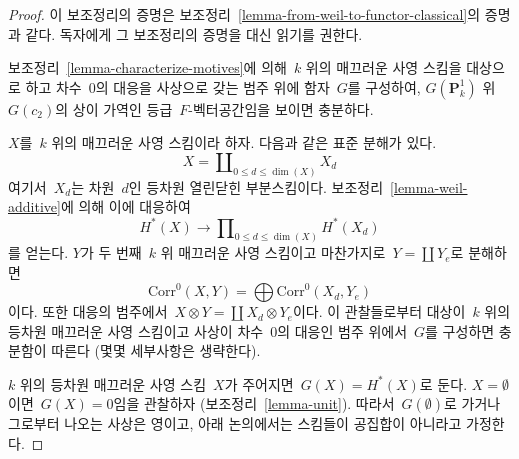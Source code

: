 \begin{proof}
이 보조정리의 증명은 보조정리\ 
\ref{lemma-from-weil-to-functor-classical}의 증명과 같다. 독자에게 그
보조정리의 증명을 대신 읽기를 권한다.

\medskip\noindent
보조정리\  \ref{lemma-characterize-motives}에 의해\  $k$ 위의 매끄러운
사영 스킴을 대상으로 하고 차수\  $0$의 대응을 사상으로 갖는 범주 위에
함자\  $G$를 구성하여, $G(\mathbf{P}^1_k)$ 위\  $G(c_2)$의 상이 가역인
등급\  $F$-벡터공간임을 보이면 충분하다.

\medskip\noindent
$X$를\  $k$ 위의 매끄러운 사영 스킴이라 하자. 다음과 같은 표준 분해가
있다.
$$
X = \coprod\nolimits_{0 \leq d \le \dim(X)} X_d
$$
여기서\  $X_d$는 차원\  $d$인 등차원 열린닫힌 부분스킴이다. 보조정리\ 
\ref{lemma-weil-additive}에 의해 이에 대응하여
$$
H^*(X) \longrightarrow \prod\nolimits_{0 \leq d \le \dim(X)} H^*(X_d)
$$
를 얻는다. $Y$가 두 번째\  $k$ 위 매끄러운 사영 스킴이고 마찬가지로\ 
$Y = \coprod Y_e$로 분해하면
$$
\text{Corr}^0(X, Y) = \bigoplus \text{Corr}^0(X_d, Y_e)
$$
이다. 또한 대응의 범주에서\  $X \otimes Y = \coprod X_d \otimes Y_e$이다.
이 관찰들로부터 대상이\  $k$ 위의 등차원 매끄러운 사영 스킴이고 사상이
차수\  $0$의 대응인 범주 위에서\  $G$를 구성하면 충분함이 따른다
(몇몇 세부사항은 생략한다).

\medskip\noindent
$k$ 위의 등차원 매끄러운 사영 스킴\  $X$가 주어지면\ 
$G(X) = H^*(X)$로 둔다. $X = \emptyset$이면\  $G(X) = 0$임을 관찰하자
(보조정리\  \ref{lemma-unit}). 따라서\  $G(\emptyset)$로 가거나
그로부터 나오는 사상은 영이고, 아래 논의에서는 스킴들이 공집합이
아니라고 가정한다.


\end{proof}
